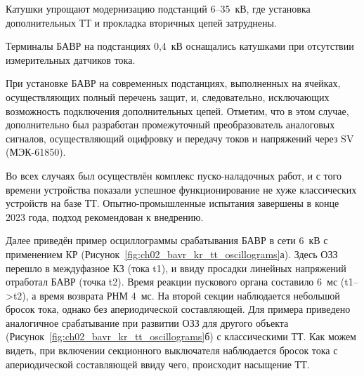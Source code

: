 Катушки упрощают модернизацию подстанций 6--35~кВ, где установка дополнительных ТТ и
прокладка вторичных цепей затруднены.

Терминалы БАВР на подстанциях 0,4~кВ оснащались катушками при отсутствии измерительных датчиков тока.

При установке БАВР на современных подстанциях, выполненных на ячейках, осуществляющих
полный перечень защит, и, следовательно, исключающих возможность подключения
дополнительных цепей. Отметим, что в этом случае, дополнительно был разработан
промежуточный преобразователь аналоговых сигналов, осуществляющий оцифровку и передачу
токов и напряжений через SV (МЭК-61850).

Во всех случаях был осуществлён комплекс пуско-наладочных работ, и с того времени
устройства показали успешное функционирование не хуже классических устройств на базе ТТ.
Опытно-промышленные испытания завершены в конце 2023 года, подход рекомендован к
внедрению.

Далее приведён пример осциллограммы срабатывания БАВР в сети 6~кВ с применением КР
(Рисунок~\ref{fig:ch02_bavr_kr_tt_oscillograms}а). Здесь ОЗЗ перешло в междуфазное КЗ
(тока t1), и ввиду просадки линейных напряжений отработал БАВР (точка t2). Время реакции
пускового органа составило 6~мс (t1–>t2), а время возврата РНМ 4~мс. На второй секции
наблюдается небольшой бросок тока, однако без апериодической составляющей. Для примера
приведено аналогичное срабатывание при развитии ОЗЗ для другого объекта
(Рисунок~\ref{fig:ch02_bavr_kr_tt_oscillograms}б) с классическими ТТ. Как можем видеть,
при включении секционного выключателя наблюдается бросок тока с апериодической
составляющей ввиду чего, происходит насыщение ТТ.

